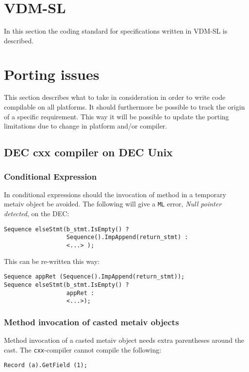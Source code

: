\documentclass[11pt,a4paper]{article}
\begin{document}
\section{VDM-SL}
In this section the coding standard for specifications written in
VDM-SL is described.

\section{Porting issues}
\label{sec:port}

This section describes what to take in consideration in order to write
code compilable on all platforms. It should furthermore be possible to
track the origin of a specific requirement. This way it will be 
possible to update the porting limitations due to change in platform
and/or compiler. 

\subsection{DEC cxx compiler on DEC Unix}
\label{sec:dec}

\subsubsection{Conditional Expression}

In conditional expressions should the invocation of method in a
temporary metaiv object be avoided. The following will give a
\texttt{ML} error, \textit{Null pointer detected}, on the DEC:

\begin{verbatim}
Sequence elseStmt(b_stmt.IsEmpty() ?
                  Sequence().ImpAppend(return_stmt) : 
                  <...> );
\end{verbatim}

This can be re-written this way:
\begin{verbatim}
Sequence appRet (Sequence().ImpAppend(return_stmt));
Sequence elseStmt(b_stmt.IsEmpty() ?
                  appRet :
                  <...>);
\end{verbatim}

\subsubsection{Method invocation of casted metaiv objects}

Method invocation of a casted metaiv object needs extra parentheses
around the cast. The \texttt{cxx}-compiler cannot compile the
following: 
\begin{verbatim}
Record (a).GetField (1);
\end{verbatim}
\end{document}
